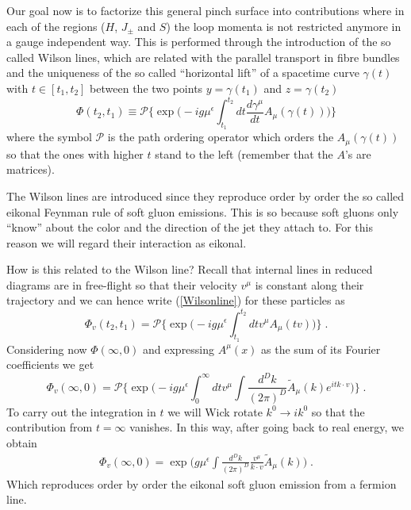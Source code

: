\documentclass[%
 reprint,
 amsmath,amssymb,
 aps,
]{revtex4-1}
\begin{document}
Our goal now is to factorize this general pinch surface into contributions where in each of the regions ($H$, $J_\pm$ and $S$) the loop momenta is not restricted anymore in a gauge independent way. This is performed through the introduction of the so called Wilson lines, which are related with the parallel transport in fibre bundles and the uniqueness of the so called ``horizontal lift'' \cite{Nakahara} of a spacetime curve $\gamma(t)$ with $t\in[t_1,t_2]$ between the two points $y=\gamma(t_1)$ and $z=\gamma(t_2)$
\begin{equation}
\Phi(t_2,t_1)\equiv \mathcal{P} \Big\{\exp\Big(-ig\mu^{\epsilon}\int_{t_1}^{t_2}dt\frac{d\gamma^\mu}{dt} A_\mu(\gamma(t))\Big)\Big\}\label{Wilsonline}
\end{equation}
where the symbol $\mathcal{P}$ is the path ordering operator which orders the $A_\mu(\gamma(t))$ so that the ones with higher $t$ stand to the left (remember that the $A$'s are matrices). \par
The Wilson lines are introduced since they reproduce order by order the so called eikonal Feynman rule of soft gluon emissions. This is so because soft gluons only ``know'' about the color and the direction of the jet they attach to. For this reason we will regard their interaction as eikonal.\par
 How is this related to the Wilson line? Recall that internal lines in reduced diagrams are in free-flight so that their velocity $v^\mu$ is constant along their trajectory and we can hence write (\ref{Wilsonline}) for these particles as
\begin{equation}
\Phi_v(t_2,t_1)=\mathcal{P} \Big\{\exp\Big(-ig\mu^{\epsilon}\int_{t_1}^{t_2}dtv^\mu A_\mu(tv)\Big)\Big\}\;.
\end{equation}
Considering now $\Phi(\infty,0)$ and expressing $A^\mu(x)$ as the sum of its Fourier coefficients we get
\begin{equation}
\Phi_v(\infty,0)=\mathcal{P} \Big\{\exp\Big(-ig\mu^{\epsilon}\int_{0}^{\infty}dtv^\mu\int\frac{d^Dk}{(2\pi)^D}\tilde{A}_\mu(k)e^{i t k\cdot v}\Big)\Big\} \;.
\end{equation}
To carry out the integration in $t$ we will Wick rotate $k^0\to ik^0$ so that the contribution from $t=\infty$ vanishes. In this way, after going back to real energy, we obtain
\begin{align}
\Phi_v(\infty,0)=\exp\Big(g\mu^{\epsilon}\int\frac{d^Dk}{(2\pi)^D}\frac{v^\mu}{k\cdot v}\tilde{A}_\mu(k)\Big)\;.
\end{align}
Which reproduces order by order the eikonal soft gluon emission from a fermion line.\par
\end{document}
